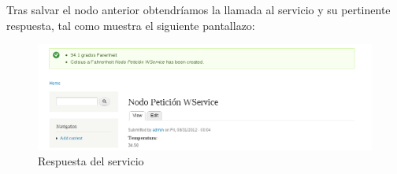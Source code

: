 Tras salvar el nodo anterior obtendríamos la llamada al servicio y su pertinente respuesta, tal como muestra 
el siguiente pantallazo:

\begin{figure}
  \centering
    \includegraphics[width=1\textwidth]{Assets/Soap/Imagenes/resultado_crear_nodo.png}
  \caption{Respuesta del servicio}
\end{figure}




